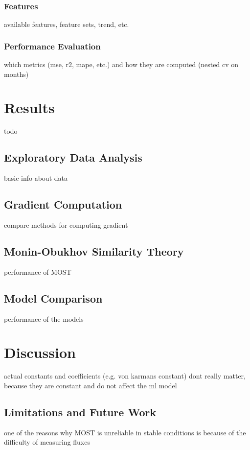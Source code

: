 \documentclass[12pt]{book}
\begin{document}
\subsection{Features}
available features, feature sets, trend, etc.

\subsection{Performance Evaluation}
which metrics (mse, r2, mape, etc.) and how they are computed (nested cv on months)

\chapter{Results}
todo

\section{Exploratory Data Analysis}
basic info about data

\section{Gradient Computation}
compare methods for computing gradient

\section{Monin-Obukhov Similarity Theory}
performance of MOST

\section{Model Comparison}
performance of the models

\chapter{Discussion}
actual constants and coefficients (e.g. von karmans constant) dont really matter, because they are constant and do not affect the ml model 

\section{Limitations and Future Work}
one of the reasons why MOST is unreliable in stable conditions is because of the difficulty of measuring fluxes



\end{document}
